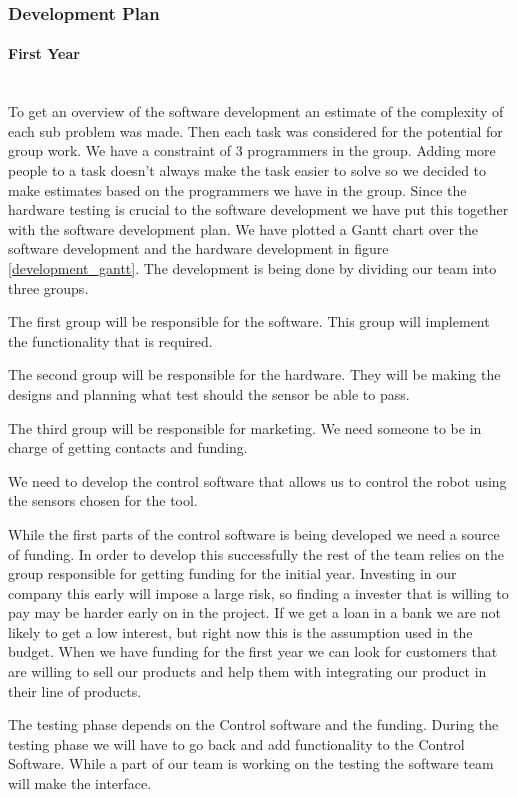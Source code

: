 \subsubsection{Development Plan}
\paragraph*{First Year}~\\
To get an overview of the software development an estimate of the complexity of each sub problem was made.
Then each task was considered for the potential for group work.
We have a constraint of 3 programmers in the group.
Adding more people to a task doesn't always make the task easier to solve so we decided to make estimates based on the programmers we have in the group.
Since the hardware testing is crucial to the software development we have put this together with the software development plan. 
We have plotted a Gantt chart over the software development and the hardware development in figure \ref{development_gantt}.
The development is being done by dividing our team into three groups. 

The first group will be responsible for the software. 
This group will implement the functionality that is required.

The second group will be responsible for the hardware. 
They will be making the designs and planning what test should the sensor be able to pass.

The third group will be responsible for marketing. 
We need someone to be in charge of getting contacts and funding. 

We need to develop the control software that allows us to control the robot using the sensors chosen for the tool. 

While the first parts of the control software is being developed we need a source of funding.
In order to develop this successfully the rest of the team relies on the group responsible for getting funding for the initial year.
Investing in our company this early will impose a large risk, so finding a invester that is willing to pay may be harder early on in the project. 
If we get a loan in a bank we are not likely to get a low interest, but right now this is the assumption used in the budget.
When we have funding for the first year we can look for customers that are willing to sell our products and help them with integrating our product in their line of products.

The testing phase depends on the Control software and the funding. 
During the testing phase we will have to go back and add functionality to the Control Software. 
While a part of our team is working on the testing the software team will make the interface.

